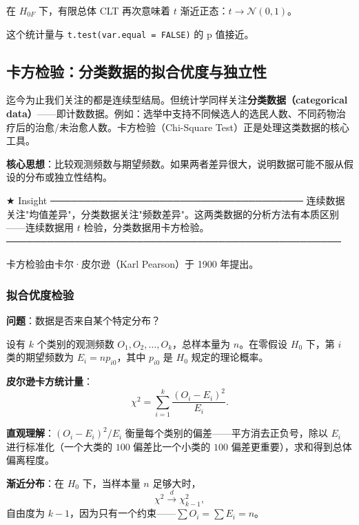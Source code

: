 在 $H_{0F}$ 下，有限总体 CLT 再次意味着 $t$ 渐近正态：$t \rightarrow \mathcal{N}(0,1)$。

这个统计量与 \texttt{t.test(var.equal = FALSE)} 的 p 值接近。


\subsection{卡方检验：分类数据的拟合优度与独立性}
\label{sec:chi-square-test}

迄今为止我们关注的都是连续型结局。但统计学同样关注\textbf{分类数据（categorical data）}——即计数数据。例如：选举中支持不同候选人的选民人数、不同药物治疗后的治愈/未治愈人数。卡方检验（Chi-Square Test）正是处理这类数据的核心工具。

\textbf{核心思想}：比较观测频数与期望频数。如果两者差异很大，说明数据可能不服从假设的分布或独立性结构。

★ Insight ─────────────────────────────────────
连续数据关注"均值差异"，分类数据关注"频数差异"。这两类数据的分析方法有本质区别——连续数据用 $t$ 检验，分类数据用卡方检验。
─────────────────────────────────────────────────

卡方检验由卡尔·皮尔逊（Karl Pearson）于 1900 年提出。

\subsubsection{拟合优度检验}

\textbf{问题}：数据是否来自某个特定分布？

设有 $k$ 个类别的观测频数 $O_1, O_2, \ldots, O_k$，总样本量为 $n$。在零假设 $H_0$ 下，第 $i$ 类的期望频数为 $E_i = n p_{i0}$，其中 $p_{i0}$ 是 $H_0$ 规定的理论概率。

\textbf{皮尔逊卡方统计量}：
\begin{equation}
\chi^2 = \sum_{i=1}^{k} \frac{(O_i - E_i)^2}{E_i}.
\label{eq:chi-square-pearson}
\end{equation}

\textbf{直观理解}：$(O_i - E_i)^2 / E_i$ 衡量每个类别的偏差——平方消去正负号，除以 $E_i$ 进行标准化（一个大类的 $100$ 偏差比一个小类的 $100$ 偏差更重要），求和得到总体偏离程度。

\textbf{渐近分布}：在 $H_0$ 下，当样本量 $n$ 足够大时，
\begin{equation}
\chi^2 \xrightarrow{d} \chi_{k-1}^2,
\label{eq:chi-square-asymptotic}
\end{equation}
自由度为 $k-1$，因为只有一个约束——$\sum O_i = \sum E_i = n$。

